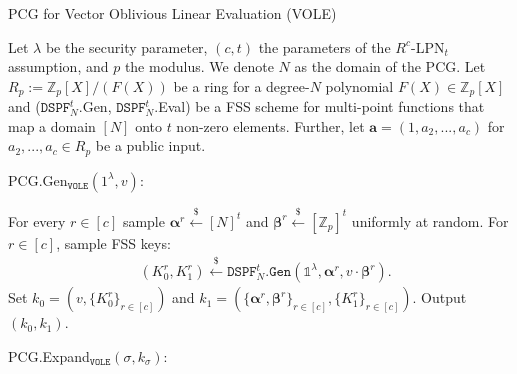 \begin{specialconstruction}{PCG for Vector Oblivious Linear Evaluation (VOLE)}
\label{construction:PCGforVOLEImpl}

\vspace{1em}

Let $\lambda$ be the security parameter, $(c,t)$ the parameters of the $R^c$-LPN$_t$ assumption, and $p$ the modulus. We denote $N$ as the domain of the PCG. Let $R_p:=\mathbb{Z}_{p}[X]/(F(X))$ be a ring for a degree-$N$ polynomial $F(X) \in \mathbb{Z}_{p}[X]$ and ($\texttt{DSPF}^{t}_{N}$.Gen, $\texttt{DSPF}^{t}_{N}$.Eval) be a FSS scheme for multi-point functions that map a domain $[N]$ onto $t$ non-zero elements. Further, let $\boldsymbol{a} = (1, a_2, ..., a_c)$ for $a_2, ...,a_c \in R_p$ be a public input.

\vspace{1em}

PCG.Gen$_{\texttt{VOLE}}(1^\lambda, v)$:

\begin{algorithmic}[1]
\State For every $r \in [c]$ sample $\boldsymbol{\alpha}^{r} \stackrel{\$}{\leftarrow}[N]^{t}$ and $\boldsymbol{\beta}^{r} \stackrel{\$}{\leftarrow} [\mathbb{Z}_{p}]^{t}$ uniformly at random.
\State For $r \in [c]$, sample FSS keys:
\begin{align*}
& \left(K_{0}^{r}, K_{1}^{r}\right) \stackrel{\$}{\leftarrow} \texttt{DSPF}^{t}_{N}\texttt{.Gen}\left(\mathds{1}^{\lambda}, \boldsymbol{\alpha}^{r}, v \cdot \boldsymbol{\beta}^{r}\right).
\end{align*}
\State Set $k_0 = (v, \{K_0^{r}\}_{r\in[c]})$ and $k_1 = (\{\boldsymbol{\alpha}^r, \boldsymbol{\beta}^r\}_{r\in[c]}, \{K_1^{r}\}_{r\in[c]})$.
\State Output $(k_0, k_1)$.
\end{algorithmic}

\vspace{1em} %

PCG.Expand$_{\texttt{VOLE}}(\sigma, k_\sigma)$:


\end{specialconstruction}
